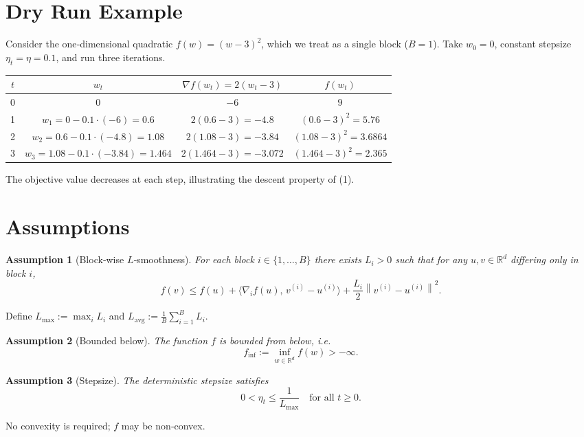 \documentclass{article}
\newtheorem{assumption}{Assumption}
\newcommand{\R}{\mathbb{R}}
\newcommand{\norm}[1]{\left\|#1\right\|}
\newcommand{\grad}{\nabla}
\begin{document}
\section*{Dry Run Example}
Consider the one‑dimensional quadratic $f(w)=(w-3)^2$, which we treat as a single block ($B=1$).  
Take $w_0=0$, constant stepsize $\eta_t=\eta=0.1$, and run three iterations.

\begin{center}
\begin{tabular}{c|c|c|c}
$t$ & $w_t$ & $\grad f(w_t)=2(w_t-3)$ & $f(w_t)$\\\hline
0 & $0$ & $-6$ & $9$\\
1 & $w_1=0-0.1\cdot(-6)=0.6$ & $2(0.6-3)=-4.8$ & $(0.6-3)^2=5.76$\\
2 & $w_2=0.6-0.1\cdot(-4.8)=1.08$ & $2(1.08-3)=-3.84$ & $(1.08-3)^2=3.6864$\\
3 & $w_3=1.08-0.1\cdot(-3.84)=1.464$ & $2(1.464-3)=-3.072$ & $(1.464-3)^2=2.365$\\
\end{tabular}
\end{center}
The objective value decreases at each step, illustrating the descent
property of (1).

\newpage
\section*{Assumptions}
\begin{assumption}[Block‑wise $L$‑smoothness]\label{ass:smooth}
For each block $i\in\{1,\dots ,B\}$ there exists $L_i>0$ such that for any
$u,v\in\R^{d}$ differing only in block $i$,
\[
f(v)\le f(u)+\langle \grad_i f(u),\,v^{(i)}-u^{(i)}\rangle
+\frac{L_i}{2}\norm{v^{(i)}-u^{(i)}}^{2}.
\tag{2}
\]
\end{assumption}
Define $L_{\max}:=\max_{i}L_i$ and $L_{\mathrm{avg}}:=\frac1B\sum_{i=1}^{B}L_i$.

\begin{assumption}[Bounded below]\label{ass:lb}
The function $f$ is bounded from below, i.e.
\[
f_{\inf}:=\inf_{w\in\R^{d}}f(w)>-\infty .
\]
\end{assumption}

\begin{assumption}[Stepsize]\label{ass:stepsize}
The deterministic stepsize satisfies
\[
0<\eta_t\le \frac{1}{L_{\max}}\quad\text{for all }t\ge0 .
\tag{3}
\]
\end{assumption}

No convexity is required; $f$ may be non‑convex.
\end{document}
